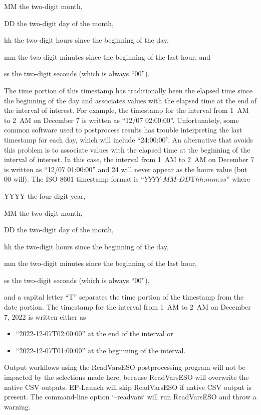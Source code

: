\begin{wherelist}
\item[MM] the two-digit month, 
\item[DD] the two-digit day of the month,
\item[hh] the two-digit hours since the beginning of the day,
\item[mm] the two-digit minutes since the beginning of the last hour, and
\item[ss] the two-digit seconds (which is always ``00'').
\end{wherelist}
%
The time portion of this timestamp has traditionally been the elapsed time since the beginning of the day and associates values
with the elapsed time at the end of the interval of interest.  For example, the timestamp for the interval from 1~AM to 2~AM on
December 7 is written as ``12/07 02:00:00''. Unfortunately, some common software used to postprocess results has trouble
interpreting the last timestamp for each day, which will include ``24:00:00''. An alternative that avoids this problem is to
associate values with the elapsed time at the beginning of the interval of interest. In this case, the interval from 1~AM to
2~AM on December 7 is written as ``12/07 01:00:00'' and 24 will never appear as the hours value (but 00 will). The ISO 8601
timestamp format is ``$YYYY$-$MM$-$DD$T$hh$:$mm$:$ss$'' where

\begin{wherelist}
\item[YYYY] the four-digit year,
\item[MM] the two-digit month, 
\item[DD] the two-digit day of the month,
\item[hh] the two-digit hours since the beginning of the day,
\item[mm] the two-digit minutes since the beginning of the last hour,
\item[ss] the two-digit seconds (which is always ``00''),
\end{wherelist}
%
and a capital letter ``T'' separates the time portion of the timestamp from the date portion. The timestamp for the interval from
1~AM to 2~AM on December 7, 2022 is written either as

\begin{itemize}
\item ``2022-12-07T02:00:00'' at the end of the interval or
\item ``2022-12-07T01:00:00'' at the beginning of the interval.
\end{itemize}
%
Output workflows using the ReadVarsESO postprocessing program will not be impacted by the selections made here, because ReadVarsESO will overwrite the native CSV outputs. EP-Launch will skip ReadVarsESO if native CSV output is present. The command-line option `--readvars` will run ReadVarsESO and throw a warning.

